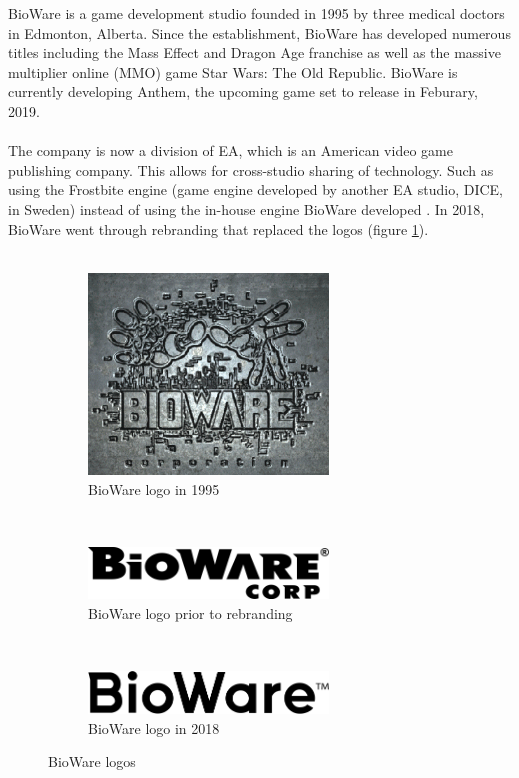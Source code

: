 \documentclass[10pt,letterpaper]{article}
\begin{document}
BioWare is a game development studio founded in 1995 by three medical doctors in Edmonton, Alberta\cite{bioware-wiki}. Since the establishment, BioWare has developed numerous titles including the Mass Effect and Dragon Age franchise as well as the massive multiplier online (MMO) game Star Wars: The Old Republic. BioWare is currently developing Anthem, the upcoming game set to release in Feburary, 2019.\\
\\
The company is now a division of EA, which is an American video game publishing company. This allows for cross-studio sharing of technology. Such as using the Frostbite engine (game engine developed by another EA studio, DICE, in Sweden) instead of using the in-house engine BioWare developed \cite{frostbite-wiki}\cite{eadice-wiki}. In 2018, BioWare went through rebranding that replaced the logos (figure \ref{fig:biowarelogos}).\cite{bioware-wiki}\\
\\
\begin{figure}[H]
	\centering
	\begin{subfigure}[c]{0.3\textwidth}
		\centering
		\includegraphics[width=0.7\textwidth]{assets/logo1995}
		\caption{BioWare logo in 1995}
	\end{subfigure}
	~
	\begin{subfigure}[c]{0.3\textwidth}
		\centering
		\includegraphics[width=0.7\textwidth]{assets/logo2005}
		\caption{BioWare logo prior to rebranding}
	\end{subfigure}
	~
	\begin{subfigure}[c]{0.3\textwidth}
		\centering
		\includegraphics[width=0.7\textwidth]{assets/logo2018}
		\caption{BioWare logo in 2018}
	\end{subfigure}
	\caption{BioWare logos}
	\label{fig:biowarelogos}
\end{figure}
\end{document}
